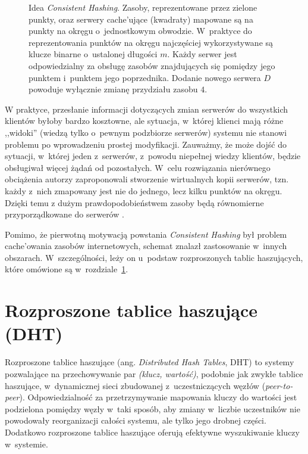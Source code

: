 \documentclass[a4paper,11pt]{scrartcl}
\newcommand{\s}{ }
\newcommand{\keszujace}{cache'ujące}
\newcommand{\keszowania}{cache'owania}
\begin{document}
\begin{figure}[ht]
\begin{minipage}[b]{0.47\linewidth}
\end{minipage}
\caption{Idea \textit{Consistent Hashing}. Zasoby, reprezentowane przez zielone punkty, oraz serwery \keszujace\s (kwadraty) mapowane są na punkty na okręgu o~jednostkowym obwodzie. W~praktyce do reprezentowania punktów na okręgu najczęściej wykorzystywane są klucze binarne o~ustalonej długości $m$. Każdy serwer jest odpowiedzialny za obsługę zasobów znajdujących się pomiędzy jego punktem i~punktem jego poprzednika. Dodanie nowego serwera $D$ powoduje wyłącznie zmianę przydziału zasobu $4$.}
\label{fig_consistent_hashing}
\end{figure}

W praktyce, przesłanie informacji dotyczących zmian serwerów do wszystkich klientów byłoby bardzo kosztowne, ale sytuacja, w~której klienci mają różne ,,widoki'' (wiedzą tylko o~pewnym podzbiorze serwerów) systemu nie stanowi problemu po wprowadzeniu prostej modyfikacji. Zauważmy, że może dojść do sytuacji, w~której jeden z~serwerów, z~powodu niepełnej wiedzy klientów, będzie obsługiwał więcej żądań od pozostałych. W~celu rozwiązania nierównego obciążenia autorzy zaproponowali stworzenie wirtualnych kopii serwerów, tzn. każdy z~nich zmapowany jest nie do jednego, lecz kilku punktów na okręgu. Dzięki temu z dużym prawdopodobieństwem zasoby będą równomierne przyporządkowane do serwerów \cite{karger1999web}.

Pomimo, że pierwotną motywacją powstania \textit{Consistent Hashing} był problem \keszowania\s zasobów internetowych, schemat znalazł zastosowanie w~innych obszarach. W~szczególności, leży on u~podstaw rozproszonych tablic haszujących, które omówione są w~rozdziale~\ref{sect_dht}.

\section{Rozproszone tablice haszujące (DHT)}
\label{sect_dht}
Rozproszone tablice haszujące (ang. \textit{Distributed Hash Tables}, DHT) to systemy pozwalające na przechowywanie par \textit{(klucz, wartość)}, podobnie jak zwykłe tablice haszujące, w~dynamicznej sieci zbudowanej z~uczestniczących węzłów (\textit{peer-to-peer}). Odpowiedzialność za przetrzymywanie mapowania kluczy do wartości jest podzielona pomiędzy węzły w~taki sposób, aby zmiany w~liczbie uczestników nie powodowały reorganizacji całości systemu, ale tylko jego drobnej części. Dodatkowo rozproszone tablice haszujące oferują efektywne wyszukiwanie kluczy w~systemie.
\end{document}
